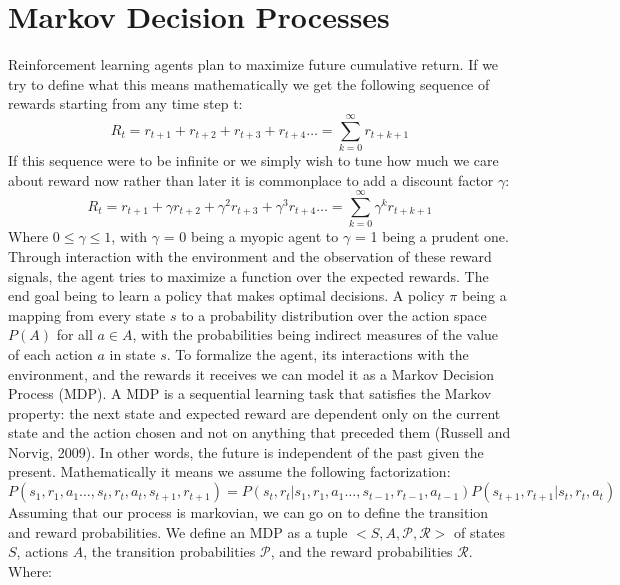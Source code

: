 \documentclass[msc, deptreport, ai, romanprepages]{infthesis}
\begin{document}
\section{Markov Decision Processes}
Reinforcement learning agents plan to maximize future cumulative return. If we try to define what this means mathematically we get the following sequence of rewards starting from any time step t:
\begin{equation}
R_t = r_{t+1} + r_{t+2} + r_{t+3} + r_{t+4}\ldots = \sum_{k=0}^\infty r_{t+k+1}
\end{equation}
If this sequence were to be infinite or we simply wish to tune how much we care about reward now rather than later it is commonplace to add a discount factor \(\gamma\):
\begin{equation}
R_t = r_{t+1} + \gamma r_{t+2} + \gamma^2 r_{t+3} + \gamma^3 r_{t+4}\ldots = \sum_{k=0}^\infty \gamma^k r_{t+k+1}
\end{equation}
Where \(0 \leq \gamma \leq 1\), with \(\gamma\) = 0 being a myopic agent to \(\gamma\) = 1 being a prudent one. Through interaction with the environment and the observation of these reward signals, the agent tries to maximize a function over the expected rewards. The end goal being to learn a policy that makes optimal decisions. A policy \(\pi\) being a mapping from every state \(s\) to a probability distribution over the action space \(P(A)\) for all \(a\in A\), with the probabilities being indirect measures of the value of each action \(a\) in state \(s\). 
To formalize the agent, its interactions with the environment, and the rewards it receives we can model it as a Markov Decision Process (MDP). A MDP is a sequential learning task that satisfies the Markov property: the next state and expected reward are dependent only on the current state and the action chosen and not on anything that preceded them (Russell and Norvig, 2009). In other words, the future is independent of the past given the present. Mathematically it means we assume the following factorization:
\begin{equation}
P(s_1, r_1, a_1 \ldots , s_t, r_t, a_t, s_{t+1}, r_{t+1}) = P(s_t, r_t | s_1, r_1, a_1 \ldots , s_{t-1}, r_{t-1}, a_{t-1}) P(s_{t+1}, r_{t+1} | s_t, r_t, a_t)
\end{equation}
Assuming that our process is markovian, we can go on to define the transition and reward probabilities. We define an MDP as a tuple \(<S,A,\mathcal{P},\mathcal{R}>\) of states \(S\), actions \(A\), the transition probabilities \(\mathcal{P}\), and the reward probabilities \(\mathcal{R}\). Where:
\end{document}
